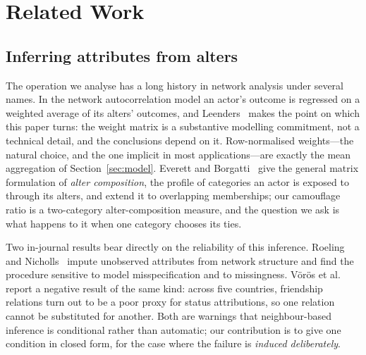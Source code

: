 \documentclass[../elsevier.tex]{subfiles}
\begin{document}
\section{Related Work}
\label{sec:related}

\subsection{Inferring attributes from alters}
\label{sec:related-alters}

The operation we analyse has a long history in network analysis under several names.
In the network autocorrelation model an actor's outcome is regressed on a weighted
average of its alters' outcomes, and Leenders~\citeyearpar{leenders2002modeling} makes the
point on which this paper turns: the weight matrix is a substantive modelling
commitment, not a technical detail, and the conclusions depend on it. Row-normalised
weights---the natural choice, and the one implicit in most applications---are exactly
the mean aggregation of Section~\ref{sec:model}. Everett and
Borgatti~\citeyearpar{everett2026alter} give the general matrix formulation of \emph{alter
composition}, the profile of categories an actor is exposed to through its alters,
and extend it to overlapping memberships; our camouflage ratio is a two-category
alter-composition measure, and the question we ask is what happens to it when one
category chooses its ties.

Two in-journal results bear directly on the reliability of this inference.
Roeling and Nicholls~\citeyearpar{roeling2020imputation} impute unobserved attributes from
network structure and find the procedure sensitive to model misspecification and to
missingness. V\"or\"os et al.~\citeyearpar{voros2019limits} report a negative result of the
same kind: across five countries, friendship relations turn out to be a poor proxy
for status attributions, so one relation cannot be substituted for another. Both are
warnings that neighbour-based inference is conditional rather than automatic; our
contribution is to give one condition in closed form, for the case where the failure
is \emph{induced deliberately}.
\end{document}
